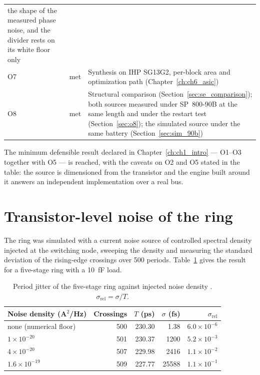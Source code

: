 \begin{table}[htbp]
\begin{tabular}{@{}llp{7.4cm}@{}}
              the shape of the measured phase noise, and the divider rests
              on its white floor only \\
O7 & met    & Synthesis on IHP SG13G2, per-block area and optimization path
              (Chapter~\ref{ch:ch6_asic}) \\
O8 & met    & Structural comparison (Section~\ref{sec:se_comparison}); both
              sources measured under SP~800-90B at the same length and
              under the restart test (Section~\ref{sec:o8}); the simulated
              source under the same battery (Section~\ref{sec:sim_90b}) \\
\bottomrule
\end{tabular}
\end{table}

The minimum defensible result declared in Chapter~\ref{ch:ch1_intro} ---
O1--O3 together with O5 --- is reached, with the caveats on O2 and O5
stated in the table: the source is dimensioned from the transistor and the engine
built around it answers an independent implementation over a real bus.

\section{Transistor-level noise of the ring}
\label{sec:spice_results}

The ring was simulated with a current noise source of controlled spectral
density injected at the switching node, sweeping the density and measuring
the standard deviation of the rising-edge crossings over 500 periods.
Table~\ref{tab:spice} gives the result for a five-stage ring with a
10~fF load.

\begin{table}[htbp]
\centering
\caption{Period jitter of the five-stage ring against injected noise
density \simu{}. $\sigma_{\mathrm{rel}} = \sigma/T$.}
\label{tab:spice}
\small
\begin{tabular}{@{}lrrrr@{}}
\toprule
Noise density (A$^2$/Hz) & Crossings & $T$ (ps) & $\sigma$ (fs) &
$\sigma_{\mathrm{rel}}$ \\
\midrule
none (numerical floor) & 500 & 230.30 & 1.38   & $6.0\times10^{-6}$ \\
$1\times10^{-20}$      & 501 & 230.37 & 1200   & $5.2\times10^{-3}$ \\
$4\times10^{-20}$      & 507 & 229.98 & 2416   & $1.1\times10^{-2}$ \\
$1.6\times10^{-19}$    & 509 & 227.77 & 25588  & $1.1\times10^{-1}$ \\
\bottomrule
\end{tabular}
\end{table}

